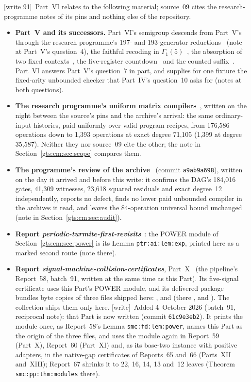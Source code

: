 \documentclass[11pt,letterpaper]{article}
\theoremstyle{definition}
\theoremstyle{remark}
\newcommand{\wtag}{\textup{[write]}}
\newcommand{\wtagd}{\textup{[write 91]}}
\begin{document}
\wtagd\ Part~VI relates to the following material; source~09 cites the research-programme notes of its pins and nothing else of the repository.
\begin{itemize}
\item \textbf{Part~V and its successors.} Part~VI's semigroup descends from Part~V's through the research programme's 197- and 193-generator reductions~\cite{repo-revmg,repo-ds193} (note at Part~V's question~4), the faithful recoding in $\Gamma_1(5)$~\cite{cm-gamma}, the absorption of two fixed contexts~\cite{cm-context}, the five-register countdown~\cite{cm-countdown} and the counted suffix~\cite{cm-counted}. Part~VI answers Part~V's question~7 in part, and supplies for one fixture the fixed-arity unbounded checker that Part~IV's question~10 asks for (notes at both questions).
\item \textbf{The research programme's uniform matrix compilers}~\cite{repo-fusion}, written on the night between the source's pins and the archive's arrival: the same ordinary-input histories, paid uniformly over valid program recipes, from 176,586 operations down to 1,393 operations at exact degree 71,105 (1,399 at degree 35,587). Neither they nor source~09 cite the other; the note in Section~\ref{gts:cm:sec:scope} compares them.
\item \textbf{The programme's review of the archive}~\cite{repo-revcm} (commit \texttt{a9ab9a698}), written on the day it arrived and before this write: it confirms the DAG's 184,016 gates, 41,309 witnesses, 23,618 squared residuals and exact degree~12 independently, reports no defect, finds no lower paid unbounded compiler in the archives it read, and leaves the 84-operation universal bound unchanged (note in Section~\ref{gts:cm:sec:audit}).
\item \textbf{Report \emph{periodic-turmite-first-revisits}}~\cite{ptr}: the POWER module of Section~\ref{gts:cm:sec:power} is its Lemma \texttt{ptr:ai:lem:exp}, printed here as a marked second route (note there).
\item \textbf{Report \emph{signal-machine-collision-certificates}}, Part~X~\cite{smc} (the pipeline's Report~58, batch~91, written at the same time as this Part). Its five-signal certificate uses this Part's POWER module, and its delivered package bundles byte copies of three files shipped here: ,  and  (there ,  and ). The collection ships them only here. \wtag\ Added 4~October 2026 (batch~91, reciprocal note): that Part is now written (commit \texttt{61c9e3eb2}). It prints the module once, as Report~58's Lemma \texttt{smc:fd:lem:power}, names this Part as the origin of the three files, and uses the module again in Report~59 (Part~X), Report~60 (Part~XI) and, as its base-two instance with positive adapters, in the native-gap certificates of Reports~65 and~66 (Parts~XII and~XIII); Report~67 shrinks it to 22, 16, 14, 13 and~12 leaves (Theorem \texttt{smc:pp:thm:modules} there).

\end{itemize}
\end{document}
